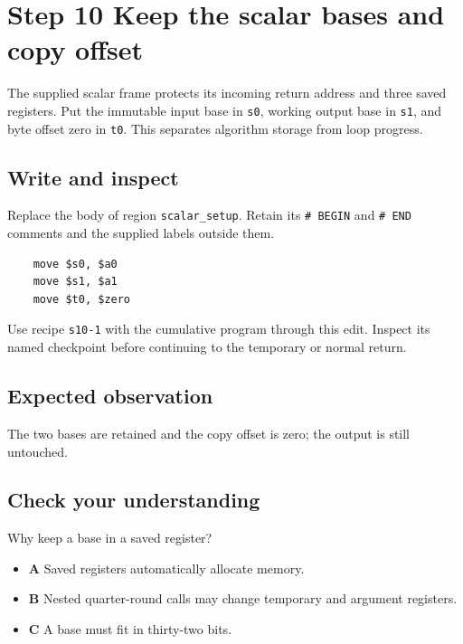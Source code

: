 \section{Step 10 Keep the scalar bases and copy offset}\label{chacha-s10}

The supplied scalar frame protects its incoming return address and three saved registers. Put the immutable input base in \texttt{s0}, working output base in \texttt{s1}, and byte offset zero in \texttt{t0}. This separates algorithm storage from loop progress.

\subsection{Write and inspect}
Replace the body of region \texttt{scalar\_setup}. Retain its \texttt{\# BEGIN} and \texttt{\# END} comments and the supplied labels outside them.

\begin{verbatim}
    move $s0, $a0
    move $s1, $a1
    move $t0, $zero
\end{verbatim}

Use recipe \texttt{s10-1} with the cumulative program through this edit. Inspect its named checkpoint before continuing to the temporary or normal return.

\subsection{Expected observation}
The two bases are retained and the copy offset is zero; the output is still untouched.

\subsection{Check your understanding}
Why keep a base in a saved register?

\begin{itemize}
  \item \textbf{A} Saved registers automatically allocate memory.
  \item \textbf{B} Nested quarter-round calls may change temporary and argument registers.
  \item \textbf{C} A base must fit in thirty-two bits.
\end{itemize}
